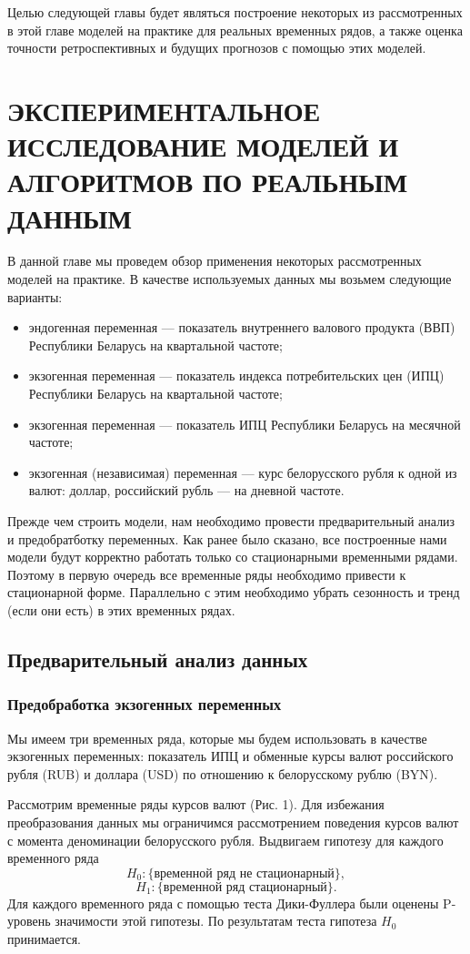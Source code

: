 \documentclass[a4paper, 12pt]{extarticle}
\numberwithin{equation}{subsection}
\begin{document}
	Целью следующей главы будет являться построение некоторых из рассмотренных в этой главе моделей на практике для реальных временных рядов, а также оценка точности ретроспективных и будущих прогнозов с помощью этих моделей.
	\newpage
	\section{ЭКСПЕРИМЕНТАЛЬНОЕ ИССЛЕДОВАНИЕ МОДЕЛЕЙ И АЛГОРИТМОВ ПО РЕАЛЬНЫМ ДАННЫМ}
	В данной главе мы проведем обзор применения некоторых рассмотренных моделей на практике. В качестве используемых данных мы возьмем следующие варианты:
	\begin{itemize}
		\item эндогенная переменная --- показатель внутреннего валового продукта (ВВП) Республики Беларусь на квартальной частоте;
		\item экзогенная переменная --- показатель индекса потребительских цен (ИПЦ) Республики Беларусь на квартальной частоте;
		\item экзогенная переменная --- показатель ИПЦ Республики Беларусь на месячной частоте;
		\item экзогенная (независимая) переменная --- курс белорусского рубля к одной из валют: доллар, российский рубль --- на дневной частоте.
	\end{itemize}
	
	Прежде чем строить модели, нам необходимо провести предварительный анализ и предобратботку переменных. Как ранее было сказано, все построенные нами модели будут корректно работать только со стационарными временными рядами. Поэтому в первую очередь все временные ряды необходимо привести к стационарной форме. Параллельно с этим необходимо убрать сезонность и тренд (если они есть) в этих временных рядах.
	\subsection{Предварительный анализ данных}
	\subsubsection{Предобработка экзогенных переменных}
	Мы имеем три временных ряда, которые мы будем использовать в качестве экзогенных переменных: показатель ИПЦ и обменные курсы валют российского рубля (RUB) и доллара (USD) по отношению к белорусскому рублю (BYN).
	
	Рассмотрим временные ряды курсов валют (Рис. 1). Для избежания преобразования данных мы ограничимся рассмотрением поведения курсов валют с момента деноминации белорусского рубля.
	Выдвигаем гипотезу для каждого временного ряда
	$$H_0 : \{\text{временной ряд не стационарный}\},$$
	$$H_1 : \{\text{временной ряд стационарный}\}.$$
	Для каждого временного ряда с помощью теста Дики-Фуллера были оценены P-уровень значимости этой гипотезы. По результатам теста гипотеза $H_0$ принимается. 
	
\end{document}

